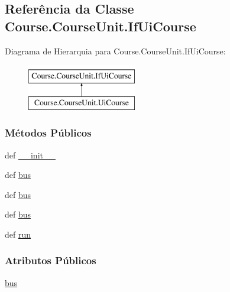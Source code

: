 \hypertarget{classCourse_1_1CourseUnit_1_1IfUiCourse}{\subsection{Referência da Classe Course.\-Course\-Unit.\-If\-Ui\-Course}
\label{classCourse_1_1CourseUnit_1_1IfUiCourse}
}
Diagrama de Hierarquia para Course.\-Course\-Unit.\-If\-Ui\-Course\-:\begin{figure}[H]
\begin{center}
\leavevmode
\includegraphics[height=2.000000cm]{d6/d82/classCourse_1_1CourseUnit_1_1IfUiCourse}
\end{center}
\end{figure}
\subsubsection*{Métodos Públicos}
\begin{DoxyCompactItemize}
\item 
def \hyperlink{classCourse_1_1CourseUnit_1_1IfUiCourse_a2520bf9924cf4f583820ad9fac468fe2}{\-\_\-\-\_\-init\-\_\-\-\_\-}
\item 
def \hyperlink{classCourse_1_1CourseUnit_1_1IfUiCourse_a6d3c42a9777fe9dd395d9390aef47903}{bus}
\item 
def \hyperlink{classCourse_1_1CourseUnit_1_1IfUiCourse_a6d3c42a9777fe9dd395d9390aef47903}{bus}
\item 
def \hyperlink{classCourse_1_1CourseUnit_1_1IfUiCourse_a6d3c42a9777fe9dd395d9390aef47903}{bus}
\item 
def \hyperlink{classCourse_1_1CourseUnit_1_1IfUiCourse_a5b174a0ca1e8fec0bb322d518c6b9cbe}{run}
\end{DoxyCompactItemize}
\subsubsection*{Atributos Públicos}
\begin{DoxyCompactItemize}
\item 
\hyperlink{classCourse_1_1CourseUnit_1_1IfUiCourse_a228fc709b99da3a7e6f5020bd07cee03}{bus}
\end{DoxyCompactItemize}


